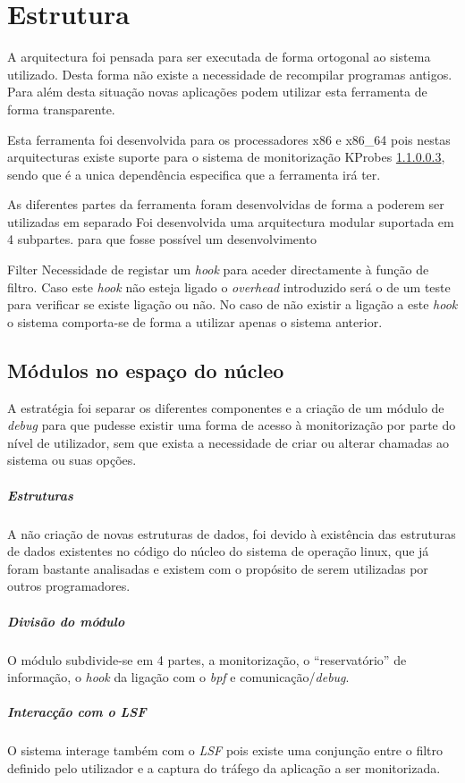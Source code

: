 \chapter{Estrutura}
\label{cap:Estrutura}


A arquitectura foi pensada para ser executada de forma ortogonal ao sistema
utilizado. Desta forma não existe a necessidade de recompilar programas
antigos. Para além desta situação novas aplicações podem utilizar esta
ferramenta de forma transparente.

Esta ferramenta foi desenvolvida para os processadores x86 e x86\_64 pois nestas
arquitecturas existe suporte para o sistema de monitorização KProbes \ref{},
sendo que é a unica dependência especifica que a ferramenta irá ter.

As diferentes partes da ferramenta foram desenvolvidas de forma a poderem ser
utilizadas em separado  
Foi desenvolvida uma arquitectura modular suportada em 4 subpartes.  para
que fosse possível um desenvolvimento 

Filter 
Necessidade de registar um \textit{hook} para aceder directamente à função de
filtro. Caso este \textit{hook} não esteja ligado o \textit{overhead}
introduzido será o de um teste para verificar se existe ligação ou não.
No caso de não existir a ligação a este \textit{hook} o sistema comporta-se de
forma a utilizar apenas o sistema anterior.

\section{Módulos no espaço do núcleo}

A estratégia foi separar os diferentes componentes e a criação de um módulo de
\textit{debug} para que pudesse existir uma forma de acesso à monitorização por
parte do nível de utilizador, sem que exista a necessidade de criar ou alterar
chamadas ao sistema ou suas opções.

\paragraph{Estruturas}

A não criação de novas estruturas de dados, foi devido à existência das
estruturas de dados existentes no código do núcleo do sistema de operação
linux, que já foram bastante analisadas e existem com o propósito de serem
utilizadas por outros programadores.

\paragraph{Divisão do módulo} 

O módulo subdivide-se em 4 partes, a monitorização, o ``reservatório'' de
informação, o \textit{hook} da ligação com o \textit{bpf} e
comunicação/\textit{debug}.

\paragraph{Interacção com o LSF}
O sistema interage também com o \textit{LSF} pois existe uma conjunção
entre o filtro definido pelo utilizador e a captura do tráfego da aplicação a
ser monitorizada.


